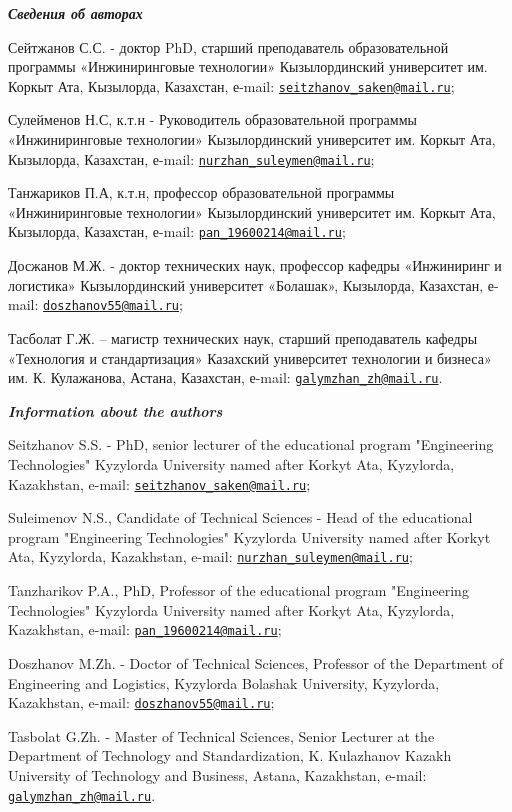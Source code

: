 \begin{authorinfo}
\hspace{1em}\emph{{\bfseries Сведения об авторах}}

Сейтжанов С.С. - доктор PhD, старший преподаватель образовательной
программы «Инжиниринговые технологии» Кызылординский университет им.
Коркыт Ата, Кызылорда, Казахстан, е-mail:
\href{mailto:seitzhanov_saken@mail.ru}{\nolinkurl{seitzhanov\_saken@mail.ru}};

Сулейменов Н.С, к.т.н - Руководитель образовательной программы
«Инжиниринговые технологии» Кызылординский университет им. Коркыт Ата,
Кызылорда, Казахстан, е-mail:
\href{mailto:nurzhan_suleymen@mail.ru}{\nolinkurl{nurzhan\_suleymen@mail.ru}};

Танжариков П.А, к.т.н, профессор образовательной программы
«Инжиниринговые технологии» Кызылординский университет им. Коркыт Ата,
Кызылорда, Казахстан, е-mail:
\href{mailto:pan_19600214@mail.ru}{\nolinkurl{pan\_19600214@mail.ru}};

Досжанов М.Ж. - доктор технических наук, профессор кафедры «Инжиниринг и
логистика» Кызылординский университет «Болашак», Кызылорда, Казахстан,
е-mail:
\href{mailto:doszhanov55@mail.ru}{\nolinkurl{doszhanov55@mail.ru}};

Тасболат Г.Ж. -- магистр технических наук, старший преподаватель кафедры
«Технология и стандартизация» Казахский университет технологии и
бизнеса» им. К. Кулажанова, Астана, Казахстан, е-mail:
\href{mailto:galymzhan_zh@mail.ru}{\nolinkurl{galymzhan\_zh@mail.ru}}.

\hspace{1em}\emph{{\bfseries Information about the authors}}

Seitzhanov S.S. - PhD, senior lecturer of the educational program
"Engineering Technologies" Kyzylorda University named after Korkyt Ata,
Kyzylorda, Kazakhstan, e-mail:
\href{mailto:seitzhanov_saken@mail.ru}{\nolinkurl{seitzhanov\_saken@mail.ru}};

Suleimenov N.S., Candidate of Technical Sciences - Head of the
educational program "Engineering Technologies" Kyzylorda University
named after Korkyt Ata, Kyzylorda, Kazakhstan, e-mail:
\href{mailto:nurzhan_suleymen@mail.ru}{\nolinkurl{nurzhan\_suleymen@mail.ru}};

Tanzharikov P.A., PhD, Professor of the educational program "Engineering
Technologies" Kyzylorda University named after Korkyt Ata, Kyzylorda,
Kazakhstan, e-mail:
\href{mailto:pan_19600214@mail.ru}{\nolinkurl{pan\_19600214@mail.ru}};

Doszhanov M.Zh. - Doctor of Technical Sciences, Professor of the
Department of Engineering and Logistics, Kyzylorda Bolashak University,
Kyzylorda, Kazakhstan, e-mail:
\href{mailto:doszhanov55@mail.ru}{\nolinkurl{doszhanov55@mail.ru}};

Tasbolat G.Zh. - Master of Technical Sciences, Senior Lecturer at the
Department of Technology and Standardization, K. Kulazhanov Kazakh
University of Technology and Business, Astana, Kazakhstan, e-mail:
\href{mailto:galymzhan_zh@mail.ru}{\nolinkurl{galymzhan\_zh@mail.ru}}.
\end{authorinfo}
